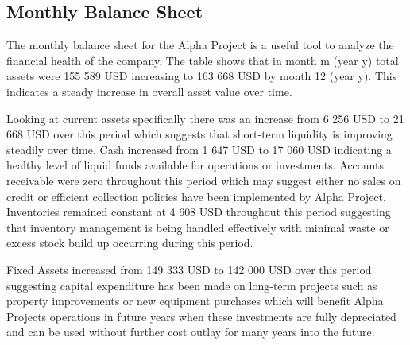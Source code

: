 

\subsection{Monthly Balance Sheet}\label{sec:title}
The monthly balance sheet for the Alpha Project is a useful tool to analyze the financial health of the company. The table shows that in month m (year y) total assets were 155 589 USD increasing to 163 668 USD by month 12 (year y). This indicates a steady increase in overall asset value over time. 

Looking at current assets specifically there was an increase from 6 256 USD to 21 668 USD over this period which suggests that short-term liquidity is improving steadily over time. Cash increased from 1 647 USD to 17 060 USD indicating a healthy level of liquid funds available for operations or investments. Accounts receivable were zero throughout this period which may suggest either no sales on credit or efficient collection policies have been implemented by Alpha Project. Inventories remained constant at 4 608 USD throughout this period suggesting that inventory management is being handled effectively with minimal waste or excess stock build up occurring during this period. 

Fixed Assets increased from 149 333 USD to 142 000 USD over this period suggesting capital expenditure has been made on long-term projects such as property improvements or new equipment purchases which will benefit Alpha Projects operations in future years when these investments are fully depreciated and can be used without further cost outlay for many years into the future. 

